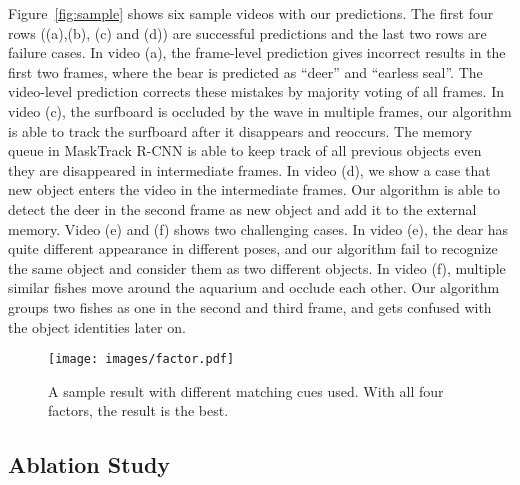 Figure~\ref{fig:sample} shows six sample videos with our predictions. The first four rows ((a),(b), (c) and (d)) are successful predictions and the last two rows are failure cases. In video (a), the frame-level prediction gives incorrect results in the first two frames, where the bear is predicted as ``deer'' and ``earless seal''. The video-level prediction corrects these mistakes by majority voting of all frames. In video (c), the surfboard is occluded by the wave in multiple frames, our algorithm is able to track the surfboard after it disappears and reoccurs. The memory queue in MaskTrack R-CNN is able to keep track of all previous objects even they are disappeared in intermediate frames. In video (d), we show a case that new object enters the video in the intermediate frames. Our algorithm is able to detect the deer in the second frame as new object and add it to the external memory.
Video (e) and (f) shows two challenging cases. In video (e), the dear has quite different appearance in different poses, and our algorithm fail to recognize the same object and consider them as two different objects. In video (f), multiple similar fishes move around the aquarium and occlude each other. Our algorithm groups two fishes as one in the second and third frame, and gets confused with the object identities later on. 

\begin{figure}[t]\centering
\texttt{[image: images/factor.pdf]}
\caption{A sample result with different matching cues used. With all four factors, the result is the best.}
\label{fig:factor}\vspace{-2pt}
\end{figure}

\subsection{Ablation Study}


